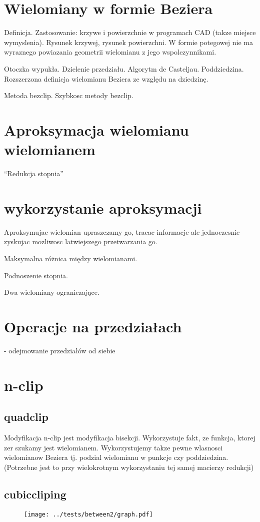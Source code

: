 \documentclass[11pt,a4paper,oneside]{report}
\begin{document}
\section{Wielomiany w formie Beziera}

Definicja. Zastosowanie: krzywe i powierzchnie w programach CAD (takze miejsce wymyslenia). Rysunek krzywej, rysunek powierzchni. W formie potegowej nie ma wyraznego powiazania geometrii wielomianu z jego wspolczynnikami. 

Otoczka wypukła. Dzielenie przedziału. Algorytm de Casteljau. Poddziedzina. Rozszerzona definicja wielomianu Beziera ze względu na dziedzinę.

Metoda bezclip. Szybkosc metody bezclip.

\section{Aproksymacja wielomianu wielomianem}

``Redukcja stopnia''

\section{wykorzystanie aproksymacji}

Aproksymujac wielomian upraszczamy go, tracac informacje ale jednoczesnie zyskujac mozliwosc latwiejszego przetwarzania go.

Maksymalna różnica między wielomianami.

Podnoszenie stopnia.

Dwa wielomiany ograniczające.

\section{Operacje na przedziałach}

- odejmowanie przedziałów od siebie

\section{n-clip}
\subsection{quadclip}

Modyfikacja n-clip jest modyfikacja bisekcji. Wykorzystuje fakt, ze funkcja, ktorej zer szukamy jest wielomianem. Wykorzystujemy takze pewne wlasnosci wielomianow Beziera tj. podzial wielomianu w punkcje czy poddziedzina. (Potrzebne jest to przy wielokrotnym wykorzystaniu tej samej macierzy redukcji)

\subsection{cubiccliping}


\begin{center}
\begin{figure}
\texttt{[image: ../tests/between2/graph.pdf]}
\end{figure}
\end{center}
\end{document}
